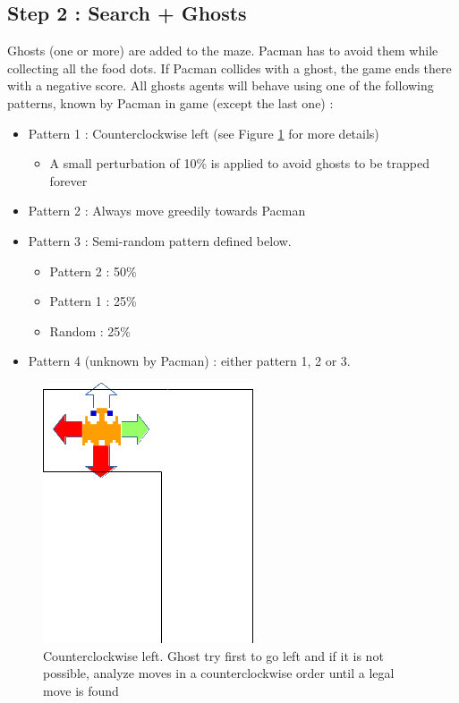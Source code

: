 \documentclass[12pt,a4paper,BCOR12mm, headexclude, footexclude, twoside, openright]{scrartcl}
\numberwithin{equation}{section} %
\numberwithin{figure}{section} %
\numberwithin{table}{section} %
\begin{document}
\subsection{Step 2 : Search + Ghosts}

Ghosts (one or more) are added to the maze. Pacman has to avoid them while collecting all the food dots. If Pacman collides with a ghost, the game ends there with a negative score. All ghosts agents will behave using one of the following patterns, known by Pacman in game (except the last one) :

\begin{itemize}
	\item Pattern 1 : Counterclockwise left (see Figure \ref{counterclockwise} for more details)
    	\begin{itemize}
        	\item A small perturbation of 10\% is applied to avoid ghosts to be trapped forever
        \end{itemize}
    \item Pattern 2 : Always move greedily towards Pacman
    \item Pattern 3 : Semi-random pattern defined below.
    \begin{itemize}
    	\item Pattern 2 : 50\%
        \item Pattern 1 : 25\%
        \item Random : 25\%
    \end{itemize}
    \item Pattern 4 (unknown by Pacman) : either pattern 1, 2 or 3.
\end{itemize}

\begin{figure}
	\label{counterclockwise}
	\begin{center}

	\includegraphics[scale=1]{ghostclockwiseleft.png}
    \caption{Counterclockwise left. Ghost try first to go left and if it is not possible, analyze moves in a counterclockwise order until a legal move is found}
    \end{center}
\end{figure}
\end{document}
